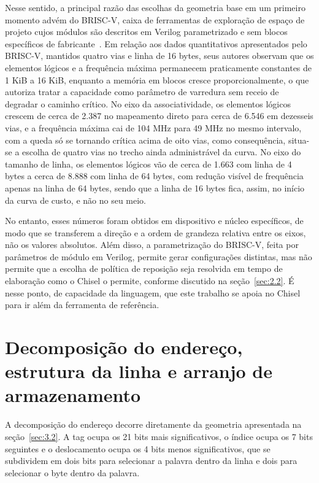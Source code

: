 Nesse sentido, a principal razão das escolhas da geometria base em um primeiro momento advém do BRISC-V, caixa de ferramentas de exploração de espaço de projeto cujos módulos são descritos em Verilog parametrizado e sem blocos específicos de fabricante~\cite{bandara2019briscv}. Em relação aos dados quantitativos apresentados pelo BRISC-V, mantidos quatro vias e linha de 16 bytes, seus autores observam que os elementos lógicos e a frequência máxima permanecem praticamente constantes de 1 KiB a 16 KiB, enquanto a memória em blocos cresce proporcionalmente, o que autoriza tratar a capacidade como parâmetro de varredura sem receio de degradar o caminho crítico. No eixo da associatividade, os elementos lógicos crescem de cerca de 2.387 no mapeamento direto para cerca de 6.546 em dezesseis vias, e a frequência máxima cai de 104 MHz para 49 MHz no mesmo intervalo, com a queda só se tornando crítica acima de oito vias, como consequência, situa-se a escolha de quatro vias no trecho ainda administrável da curva. No eixo do tamanho de linha, os elementos lógicos vão de cerca de 1.663 com linha de 4 bytes a cerca de 8.888 com linha de 64 bytes, com redução visível de frequência apenas na linha de 64 bytes, sendo que a linha de 16 bytes fica, assim, no início da curva de custo, e não no seu meio.

No entanto, esses números foram obtidos em dispositivo e núcleo específicos, de modo que se transferem a direção e a ordem de grandeza relativa entre os eixos, não os valores absolutos. Além disso, a parametrização do BRISC-V, feita por parâmetros de módulo em Verilog, permite gerar configurações distintas, mas não permite que a escolha de política de reposição seja resolvida em tempo de elaboração como o Chisel o permite, conforme discutido na seção~\ref{sec:2.2}. É nesse ponto, de capacidade da linguagem, que este trabalho se apoia no Chisel para ir além da ferramenta de referência.

\section{Decomposição do endereço, estrutura da linha e arranjo de armazenamento}\label{sec:3.3}

A decomposição do endereço decorre diretamente da geometria apresentada na seção~\ref{sec:3.2}. A tag ocupa os 21 bits mais significativos, o índice ocupa os 7 bits seguintes e o deslocamento ocupa os 4 bits menos significativos, que se subdividem em dois bits para selecionar a palavra dentro da linha e dois para selecionar o byte dentro da palavra.

